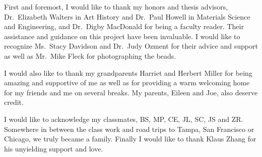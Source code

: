%
%

First and foremost, I would like to thank my honors and thesis advisors, Dr.\ Elizabeth Walters in Art History and Dr.\ Paul Howell in Materials Science and Engineering, and Dr.\ Digby MacDonald for being a faculty reader. Their assistance and guidance on this project have been invaluable. I would like to recognize Ms.\ Stacy Davidson and Dr.\ Judy Ozment for their advice and support as well as Mr.\ Mike Fleck for photographing the beads.

I would also like to thank my grandparents Harriet and Herbert Miller for being amazing and supportive of me as well as for providing a warm welcoming home for my friends and me on several breaks. My parents, Eileen and Joe, also deserve credit.

I would like to acknowledge my classmates, BS, MP, CE, JL, SC, JS and ZR. Somewhere in between the class work and road trips to Tampa, San Francisco or Chicago, we truly became a family. Finally I would like to thank Klaus Zhang for his unyielding support and love.